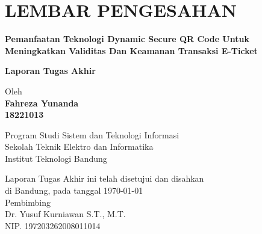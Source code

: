 \chapter*{LEMBAR PENGESAHAN}


\begin{center}
    \vspace{2cm}
  {\large\bfseries Pemanfaatan Teknologi Dynamic Secure QR Code Untuk Meningkatkan Validitas Dan Keamanan Transaksi E-Ticket}\\
     \vspace{2cm}

  {\Large \textbf{Laporan Tugas Akhir}}\\


  \vspace{1.5cm}
    
    
  {\large Oleh}\\[0.3cm]
    \textbf{
    {\large Fahreza Yunanda}\\
    {\large 18221013}
  }\\
    
  \vspace{0.5cm}
 
  {\large Program Studi Sistem dan Teknologi Informasi}\\
  {\large Sekolah Teknik Elektro dan Informatika}\\
  {\large Institut Teknologi Bandung}\\

  \vspace{1.5cm}

  Laporan Tugas Akhir ini telah disetujui dan disahkan\\ 
  di Bandung, pada tanggal \today\\[1cm]

	Pembimbing  \\[3cm]
	Dr. Yusuf Kurniawan S.T., M.T.   \\[0.2cm]
	NIP. 197203262008011014 

\end{center}

\vspace{1cm}
\noindent



